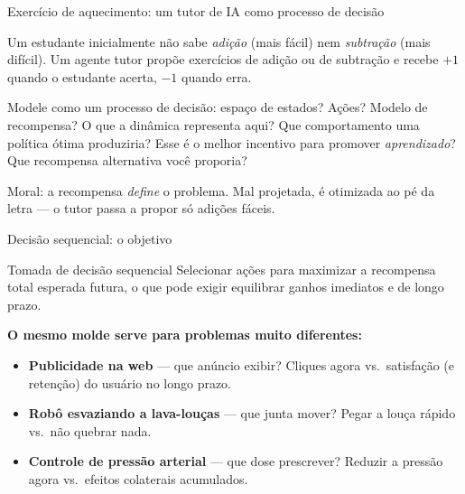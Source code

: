 \documentclass[aspectratio=169, 11pt]{beamer}
\begin{document}
\begin{frame}{Exercício de aquecimento: um tutor de IA como processo de decisão}
  \begin{quizbox}{}
    Um estudante inicialmente não sabe \emph{adição} (mais fácil) nem
    \emph{subtração} (mais difícil). Um agente tutor propõe exercícios de
    adição ou de subtração e recebe $+1$ quando o estudante acerta,
    $-1$ quando erra.

    \smallskip
    Modele como um processo de decisão: espaço de estados? Ações? Modelo
    de recompensa? O que a dinâmica representa aqui? Que comportamento
    uma política ótima produziria? Esse é o melhor incentivo para promover
    \emph{aprendizado}? Que recompensa alternativa você proporia?

  \end{quizbox}

  \begin{alertabox}
    Moral: a recompensa \emph{define} o problema. Mal projetada, é
    otimizada ao pé da letra — o tutor passa a propor só adições fáceis.
  \end{alertabox}
\end{frame}

\begin{frame}{Decisão sequencial: o objetivo}
  \begin{defbox}{Tomada de decisão sequencial}
    Selecionar ações para \alert{maximizar a recompensa total esperada
    futura}, o que pode exigir equilibrar ganhos imediatos e de longo
    prazo.
  \end{defbox}

  \textbf{O mesmo molde serve para problemas muito diferentes:}
  \begin{itemize}
    \item \textbf{Publicidade na web} — que anúncio exibir? Cliques agora
          vs.\ satisfação (e retenção) do usuário no longo prazo.
    \item \textbf{Robô esvaziando a lava-louças} — que junta mover? Pegar a
          louça rápido vs.\ não quebrar nada.
    \item \textbf{Controle de pressão arterial} — que dose prescrever?
          Reduzir a pressão agora vs.\ efeitos colaterais acumulados.
  \end{itemize}
\end{frame}
\end{document}
